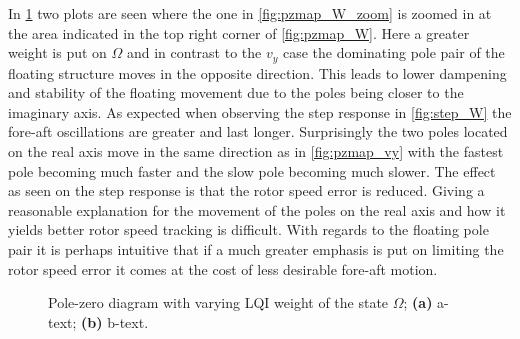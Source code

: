 In \cref{fig:pzmap_W_both} two plots are seen where the one in \cref{fig:pzmap_W_zoom} is zoomed in at the area indicated in the top right corner of \cref{fig:pzmap_W}. Here a greater weight is put on $ \Omega $ and in contrast to the $ v_y $ case the dominating pole pair of the floating structure moves in the opposite direction. This leads to lower dampening and stability of the floating movement due to the poles being closer to the imaginary axis. As expected when observing the step response in \cref{fig:step_W} the fore-aft oscillations are greater and last longer. Surprisingly the two poles located on the real axis move in the same direction as in \cref{fig:pzmap_vy} with the fastest pole becoming much faster and the slow pole becoming much slower. The effect as seen on the step response is that the rotor speed error is reduced. Giving a reasonable explanation for the movement of the poles on the real axis and how it yields better rotor speed tracking is difficult. With regards to the floating pole pair it is perhaps intuitive that if a much greater emphasis is put on limiting the rotor speed error it comes at the cost of less desirable fore-aft motion.
\begin{figure}[ht]
	\centering
	
	\hfil
	
	\caption{Pole-zero diagram with varying LQI weight of the state $ \Omega $; \textbf{(a)} a-text; \textbf{(b)} b-text.}
	\label{fig:pzmap_W_both}
\end{figure}
